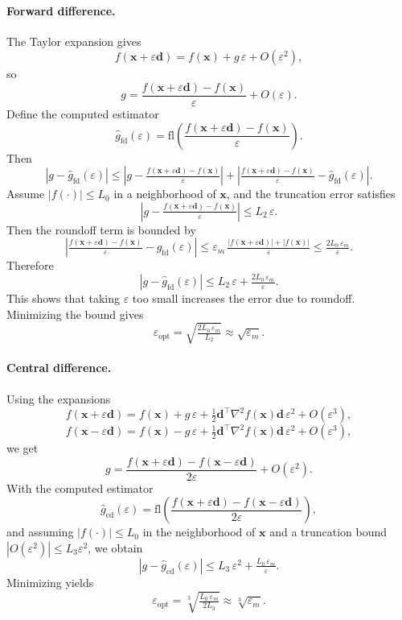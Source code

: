 \paragraph{Forward difference.}
The Taylor expansion gives
\[
  f(\mathbf{x}+\varepsilon \mathbf{d})=f(\mathbf{x})+g\,\varepsilon+O(\varepsilon^{2}),
\]
so
\[
  g=\frac{f(\mathbf{x}+\varepsilon \mathbf{d})-f(\mathbf{x})}{\varepsilon}+O(\varepsilon).
\]
Define the computed estimator
\[
  \widehat g_{\mathrm{fd}}(\varepsilon)=
  \mathrm{fl}\!\left(\frac{f(\mathbf{x}+\varepsilon \mathbf{d})-f(\mathbf{x})}{\varepsilon}\right).
\]
Then
\[
  |g-\widehat g_{\mathrm{fd}}(\varepsilon)|
  \le |g-\tfrac{f(\mathbf{x}+\varepsilon \mathbf{d})-f(\mathbf{x})}{\varepsilon}|
  +\left|\tfrac{f(\mathbf{x}+\varepsilon \mathbf{d})-f(\mathbf{x})}{\varepsilon}
  -\widehat g_{\mathrm{fd}}(\varepsilon)\right|.
\]
Assume $|f(\cdot)|\le L_0$ in a neighborhood of $\mathbf{x}$, and the truncation
error satisfies
\[
  \left|g-\tfrac{f(\mathbf{x}+\varepsilon \mathbf{d})-f(\mathbf{x})}{\varepsilon}\right|
  \le L_2\,\varepsilon.
\]
Then the roundoff term is bounded by
\[
  \left|\tfrac{f(\mathbf{x}+\varepsilon \mathbf{d})-f(\mathbf{x})}{\varepsilon}
  -\widehat g_{\mathrm{fd}}(\varepsilon)\right|
  \le \varepsilon_m\,\tfrac{|f(\mathbf{x}+\varepsilon \mathbf{d})|+|f(\mathbf{x})|}{\varepsilon}
  \le \tfrac{2L_0\,\varepsilon_m}{\varepsilon}.
\]
Therefore
\[
  |g-\widehat g_{\mathrm{fd}}(\varepsilon)|
  \le L_2\,\varepsilon+\tfrac{2L_0\,\varepsilon_m}{\varepsilon}.
\]
This shows that taking $\varepsilon$ too small increases the error due to
roundoff. Minimizing the bound gives
\[
  \varepsilon_{\mathrm{opt}}=
  \sqrt{\tfrac{2L_0\,\varepsilon_m}{L_2}}
  \approx \sqrt{\varepsilon_m}.
\]

\paragraph{Central difference.}
Using the expansions
\[
  f(\mathbf{x}+\varepsilon \mathbf{d})=f(\mathbf{x})+g\,\varepsilon
  +\tfrac{1}{2}\mathbf{d}^\top\nabla^2 f(\mathbf{x})\mathbf{d}\,\varepsilon^2+O(\varepsilon^3),
\]
\[
  f(\mathbf{x}-\varepsilon \mathbf{d})=f(\mathbf{x})-g\,\varepsilon
  +\tfrac{1}{2}\mathbf{d}^\top\nabla^2 f(\mathbf{x})\mathbf{d}\,\varepsilon^2+O(\varepsilon^3),
\]
we get
\[
  g=\frac{f(\mathbf{x}+\varepsilon \mathbf{d})-f(\mathbf{x}-\varepsilon \mathbf{d})}{2\varepsilon}
  +O(\varepsilon^2).
\]
With the computed estimator
\[
  \widehat g_{\mathrm{cd}}(\varepsilon)=
  \mathrm{fl}\!\left(\frac{f(\mathbf{x}+\varepsilon \mathbf{d})-f(\mathbf{x}-\varepsilon \mathbf{d})}
  {2\varepsilon}\right),
\]
and assuming $|f(\cdot)|\le L_0$ in the neighborhood of $\mathbf{x}$ and
a truncation bound $|O(\varepsilon^2)|\le L_3\varepsilon^2$, we obtain
\[
  |g-\widehat g_{\mathrm{cd}}(\varepsilon)|
  \le L_3\,\varepsilon^2+\tfrac{L_0\,\varepsilon_m}{\varepsilon}.
\]
Minimizing yields
\[
  \varepsilon_{\mathrm{opt}}=
  \sqrt[3]{\tfrac{L_0\,\varepsilon_m}{2L_3}}
  \approx \sqrt[3]{\varepsilon_m}.
\]

